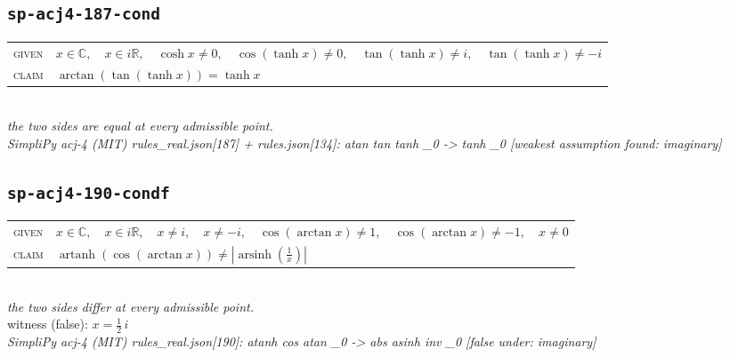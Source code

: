 \documentclass[11pt]{article}
\begin{document}
\subsection*{\texttt{sp-acj4-187-cond}}
\begin{tabular}{@{}l@{\quad}l@{}}
\textsc{given} & $x \in \mathbb{C},\quad x \in i\mathbb{R},\quad \cosh x \neq 0,\quad \cos\left(\tanh x\right) \neq 0,\quad \tan\left(\tanh x\right) \neq i,\quad \tan\left(\tanh x\right) \neq -i$ \\[4pt]
\textsc{claim} & $\displaystyle \arctan\left(\tan\left(\tanh x\right)\right) = \tanh x$ \\
\end{tabular}\\[2pt]
{\small\emph{the two sides are equal at every admissible point.}}\\
\emph{SimpliPy acj-4 (MIT) rules\_real.json[187] + rules.json[134]: atan tan tanh \_0  ->  tanh \_0  [weakest assumption found: imaginary]}\\

\subsection*{\texttt{sp-acj4-190-condf}}
\begin{tabular}{@{}l@{\quad}l@{}}
\textsc{given} & $x \in \mathbb{C},\quad x \in i\mathbb{R},\quad x \neq i,\quad x \neq -i,\quad \cos\left(\arctan x\right) \neq 1,\quad \cos\left(\arctan x\right) \neq -1,\quad x \neq 0$ \\[4pt]
\textsc{claim} & $\displaystyle \operatorname{artanh}\left(\cos\left(\arctan x\right)\right) \neq \left|\operatorname{arsinh}\left(\frac{1}{x}\right)\right|$ \\
\end{tabular}\\[2pt]
{\small\emph{the two sides differ at every admissible point.}}\\
{\footnotesize\color{gray}witness (false): $x = \frac{1}{2} \, i$}\\
\emph{SimpliPy acj-4 (MIT) rules\_real.json[190]: atanh cos atan \_0  ->  abs asinh inv \_0  [false under: imaginary]}\\
\end{document}
